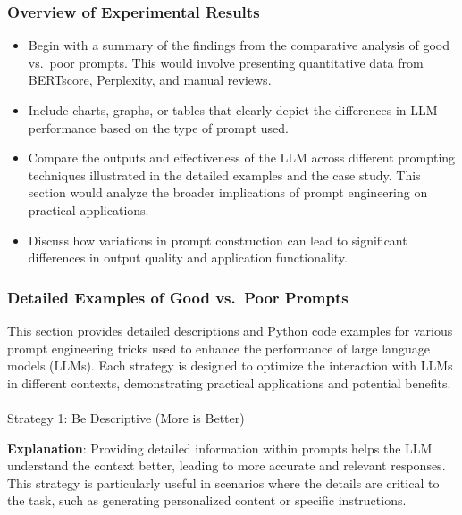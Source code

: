 \documentclass[
]{agujournal2019}
\makeatletter
\let\oldparagraph\paragraph
\renewcommand{\paragraph}{
    \@ifstar
      \xxxParagraphStar
      \xxxParagraphNoStar
  }
\newcommand{\xxxParagraphStar}[1]{\oldparagraph*{#1}\mbox{}}
\newcommand{\xxxParagraphNoStar}[1]{\oldparagraph{#1}\mbox{}}
\providecommand{\tightlist}{%
  \setlength{\itemsep}{0pt}\setlength{\parskip}{0pt}}\usepackage{longtable,booktabs,array}
\makeatother
\begin{document}
\subsubsection{Overview of Experimental
Results}\label{overview-of-experimental-results}

\begin{itemize}
\tightlist
\item
  Begin with a summary of the findings from the comparative analysis of
  good vs.~poor prompts. This would involve presenting quantitative data
  from BERTscore, Perplexity, and manual reviews.
\item
  Include charts, graphs, or tables that clearly depict the differences
  in LLM performance based on the type of prompt used.
\item
  Compare the outputs and effectiveness of the LLM across different
  prompting techniques illustrated in the detailed examples and the case
  study. This section would analyze the broader implications of prompt
  engineering on practical applications.
\item
  Discuss how variations in prompt construction can lead to significant
  differences in output quality and application functionality.
\end{itemize}

\subsubsection{Detailed Examples of Good vs.~Poor
Prompts}\label{detailed-examples-of-good-vs.-poor-prompts}

This section provides detailed descriptions and Python code examples for
various prompt engineering tricks used to enhance the performance of
large language models (LLMs). Each strategy is designed to optimize the
interaction with LLMs in different contexts, demonstrating practical
applications and potential benefits.

\paragraph{Strategy 1: Be Descriptive (More is
Better)}\label{strategy-1-be-descriptive-more-is-better}

\textbf{Explanation}: Providing detailed information within prompts
helps the LLM understand the context better, leading to more accurate
and relevant responses. This strategy is particularly useful in
scenarios where the details are critical to the task, such as generating
personalized content or specific instructions.
\end{document}
